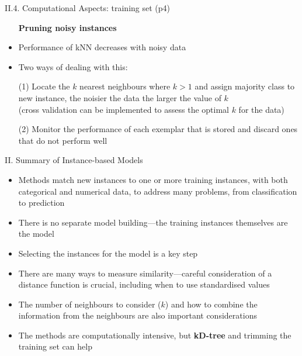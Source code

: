 \documentclass[handout]{beamer}
\newcommand{\strong}[1]{\textbf{\color{teal} #1}}
\begin{document}
\begin{frame}{II.4. Computational Aspects: training set (p4)}
\begin{itemize}
\item[] \strong{Pruning noisy instances}
\item[]
\item Performance of kNN decreases with noisy data
\item[]
\item Two ways of dealing with this:
\item[(1)] Locate the $k$ nearest neighbours where $k>1$ and assign majority class to new instance, the noisier the data the larger the value of $k$\\
(cross validation can be implemented to assess the optimal $k$ for the data) 
\item[(2)] Monitor the performance of each exemplar that is stored and discard ones that do not perform well
\end{itemize}
\end{frame}
\begin{frame}{II. Summary of Instance-based Models}
\begin{itemize}
\item Methods match new instances to one or more training instances, with both categorical and numerical data, to address many problems, from classification to prediction
\item There is no separate model building---the training instances themselves are the model
\item Selecting the instances for the model is a key step
\item There are many ways to measure similarity---careful consideration of a distance function is crucial, including when to use standardised values
\item The number of neighbours to consider ($k$) and how to combine the information from the neighbours are also important considerations
\item The methods are computationally intensive, but \strong{kD-tree} and trimming the training set can help
\end{itemize}
\end{frame}


\end{document}
